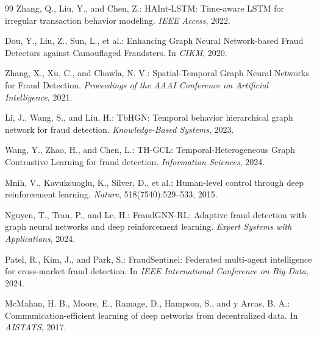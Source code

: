 \documentclass[12pt,a4paper]{report}
\begin{document}
\begin{thebibliography}{99}
Zhang, Q., Liu, Y., and Chen, Z.:
\newblock HAInt-LSTM: Time-aware LSTM for irregular transaction behavior modeling.
\newblock \emph{IEEE Access}, 2022.

Dou, Y., Liu, Z., Sun, L., et al.:
\newblock Enhancing Graph Neural Network-based Fraud Detectors against Camouflaged Fraudsters.
\newblock In \emph{CIKM}, 2020.

Zhang, X., Xu, C., and Chawla, N. V.:
\newblock Spatial-Temporal Graph Neural Networks for Fraud Detection.
\newblock \emph{Proceedings of the AAAI Conference on Artificial Intelligence}, 2021.

Li, J., Wang, S., and Liu, H.:
\newblock TbHGN: Temporal behavior hierarchical graph network for fraud detection.
\newblock \emph{Knowledge-Based Systems}, 2023.

Wang, Y., Zhao, H., and Chen, L.:
\newblock TH-GCL: Temporal-Heterogeneous Graph Contrastive Learning for fraud detection.
\newblock \emph{Information Sciences}, 2024.

Mnih, V., Kavukcuoglu, K., Silver, D., et al.:
\newblock Human-level control through deep reinforcement learning.
\newblock \emph{Nature}, 518(7540):529--533, 2015.

Nguyen, T., Tran, P., and Le, H.:
\newblock FraudGNN-RL: Adaptive fraud detection with graph neural networks and deep reinforcement learning.
\newblock \emph{Expert Systems with Applications}, 2024.

Patel, R., Kim, J., and Park, S.:
\newblock FraudSentinel: Federated multi-agent intelligence for cross-market fraud detection.
\newblock In \emph{IEEE International Conference on Big Data}, 2024.

McMahan, H. B., Moore, E., Ramage, D., Hampson, S., and y Arcas, B. A.:
\newblock Communication-efficient learning of deep networks from decentralized data.
\newblock In \emph{AISTATS}, 2017.

\end{thebibliography}
\end{document}
